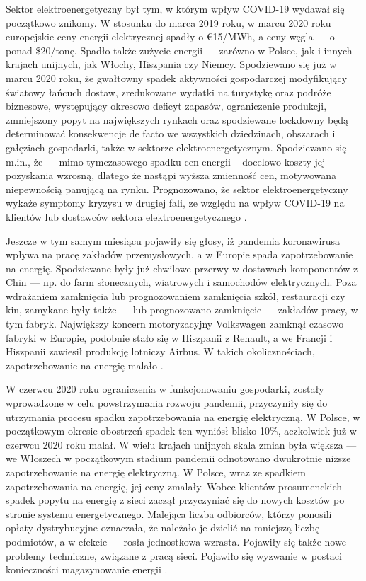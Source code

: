 \documentclass[polish, twoside, 12pt, a4paper]{article}
\theoremstyle{definition}
\theoremstyle{plain}
\theoremstyle{remark}
\begin{document}
Sektor elektroenergetyczny był tym, w którym wpływ COVID-19 wydawał się początkowo znikomy. W stosunku do marca 2019 roku, w marcu 2020 roku europejskie ceny energii elektrycznej spadły o €15/MWh, a ceny węgla --- o ponad \$20/tonę. Spadło także zużycie energii --- zarówno w Polsce, jak i innych krajach unijnych, jak Włochy, Hiszpania czy Niemcy. Spodziewano się już w marcu 2020 roku, że gwałtowny spadek aktywności gospodarczej modyfikujący światowy łańcuch dostaw, zredukowane wydatki na turystykę oraz podróże biznesowe, występujący okresowo deficyt zapasów, ograniczenie produkcji, zmniejszony popyt na największych rynkach oraz spodziewane lockdowny będą determinować konsekwencje de facto we wszystkich dziedzinach, obszarach i gałęziach gospodarki, także w sektorze elektroenergetycznym. Spodziewano się m.in., że --- mimo tymczasowego spadku cen energii – docelowo koszty jej pozyskania wzrosną, dlatego że nastąpi wyższa zmienność cen, motywowana niepewnością panującą na rynku. Prognozowano, że sektor elektroenergetyczny wykaże symptomy kryzysu w drugiej fali, ze względu na wpływ COVID-19 na klientów lub dostawców sektora elektroenergetycznego \citep{wajer2023}. 

Jeszcze w tym samym miesiącu pojawiły się głosy, iż pandemia koronawirusa wpływa na pracę zakładów przemysłowych, a w Europie spada zapotrzebowanie na energię. Spodziewane były już chwilowe przerwy w dostawach komponentów z Chin --- np. do farm słonecznych, wiatrowych i samochodów elektrycznych. Poza wdrażaniem zamknięcia lub prognozowaniem zamknięcia szkół, restauracji czy kin, zamykane były także --- lub prognozowano zamknięcie --- zakładów pracy, w tym fabryk. Największy koncern motoryzacyjny Volkswagen zamknął czasowo fabryki w Europie, podobnie stało się w Hiszpanii z Renault, a we Francji i Hiszpanii zawiesił produkcję lotniczy Airbus. W takich okolicznościach, zapotrzebowanie na energię malało \citep{wysokienapiecie2023}. 

W czerwcu 2020 roku ograniczenia w funkcjonowaniu gospodarki, zostały wprowadzone w celu powstrzymania rozwoju pandemii, przyczyniły się do utrzymania procesu spadku zapotrzebowania na energię elektryczną. W Polsce, w początkowym okresie obostrzeń spadek ten wyniósł blisko 10\%, aczkolwiek już w czerwcu 2020 roku malał. W wielu krajach unijnych skala zmian była większa --- we Włoszech w początkowym stadium pandemii odnotowano dwukrotnie niższe zapotrzebowanie na energię elektryczną. W Polsce, wraz ze spadkiem zapotrzebowania na energię, jej ceny zmalały. Wobec klientów prosumenckich spadek popytu na energię z sieci zaczął przyczyniać się do nowych kosztów po stronie systemu energetycznego. Malejąca liczba odbiorców, którzy ponosili opłaty dystrybucyjne oznaczała, że należało je dzielić na mniejszą liczbę podmiotów, a w efekcie --- rosła jednostkowa wzrasta. Pojawiły się także nowe problemy techniczne, związane z pracą sieci. Pojawiło się wyzwanie w postaci konieczności magazynowanie energii \citep{ure2023}.
\end{document}
